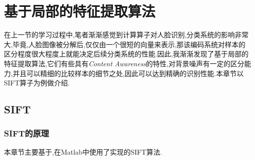 \chapter{基于局部的特征提取算法}
在上一节的学习过程中,笔者渐渐感觉到计算算子对人脸识别,分类系统的影响非常大,毕竟,人脸图像被分解后,仅仅由一个很短的向量来表示,那该编码系统对样本的区分程度很大程度上就能决定后续分类系统的性能.因此,我渐渐发现了基于局部的特征提取算法,它们有些具有\textit{Content Awareness}的特性,对背景噪声有一定的区分能力,并且可以精细的比较样本的细节之处,因此可以达到精确的识别性能.本章节以SIFT算子为例做介绍.

\section{SIFT}
\subsection{SIFT的原理}
本章节主要基于\cite{lowe2004distinctive, issolah2013sift, juan2009comparison, siftopencv, siftvlfeat, siftubc,lowe1999object},在Matlab中使用了\cite{siftvlfeat}实现的SIFT算法. \newline

